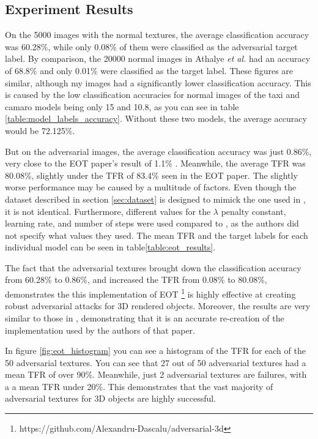 \subsection{Experiment Results}
    \label{subsec:eot_experiment_results}

On the 5000 images with the normal textures, the average classification accuracy was 60.28\%, while only 0.08\% of them were classified as the adversarial target label. By comparison, the 20000 normal images in Athalye \textit{et al.} \cite{athalye} had an accuracy of 68.8\% and only 0.01\% were classified as the target label. These figures are similar, although my images had a significantly lower classification accuracy. This is caused by the low classification accuracies for normal images of the taxi and camaro models being only 15 and 10.8, as you can see in table \ref{table:model_labels_accuracy}. Without these two models, the average accuracy would be 72.125\%. 

But on the adversarial images, the average classification accuracy was just 0.86\%, very close to the EOT paper's result of 1.1\% \cite{athalye}. Meanwhile, the average TFR was 80.08\%, slightly under the TFR of 83.4\% seen in the EOT paper. The slightly worse performance may be caused by a multitude of factors. Even though the dataset described in section \ref{sec:dataset} is designed to mimick the one used in \cite{athalye}, it is not identical. Furthermore, different values for the $\lambda$ penalty constant, learning rate, and number of steps were used compared to \cite{athalye}, as the authors did not specify what values they used. The mean TFR and the target labels for each individual model can be seen in table\ref{table:eot_results}.

The fact that the adversarial textures brought down the classification accuracy from 60.28\% to 0.86\%, and increased the TFR from 0.08\% to 80.08\%, demonstrates the this implementation of EOT \footnote{https://github.com/Alexandru-Dascalu/adversarial-3d} is highly effective at creating robust adversarial attacks for 3D rendered objects. Moreover, the results are very similar to those in \cite{athalye}, demonstrating that it is an accurate re-creation of the implementation used by the authors of that paper.

In figure \ref{fig:eot_histogram} you can see a histogram of the TFR for each of the 50 adversarial textures. You can see that 27 out of 50 adversarial textures had a mean TFR of over 90\%. Meanwhile, just 2 adversarial textures are failures, with a a mean TFR under 20\%. This demonstrates that the vast majority of adversarial textures for 3D objects are highly successful.


